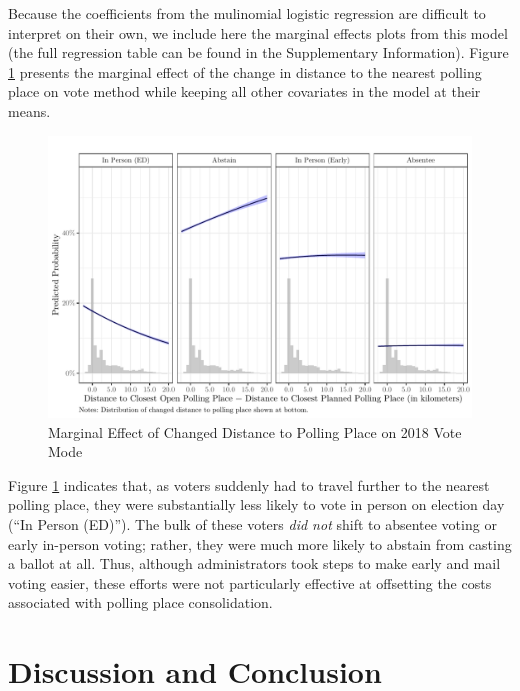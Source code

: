 \documentclass[
  12pt,
]{article}
\begin{document}
Because the coefficients from the mulinomial logistic regression are difficult to interpret on their own, we include here the marginal effects plots from this model (the full regression table can be found in the Supplementary Information). Figure \ref{fig:marg-multi} presents the marginal effect of the change in distance to the nearest polling place on vote method while keeping all other covariates in the model at their means.

\begin{figure}[h]

{\centering \includegraphics{hurricane_michael_files/figure-latex/marg-multi-1} 

}

\caption{\label{fig:marg-multi}Marginal Effect of Changed Distance to Polling Place on 2018 Vote Mode}\label{fig:marg-multi}
\end{figure}

Figure \ref{fig:marg-multi} indicates that, as voters suddenly had to travel further to the nearest polling place, they were substantially less likely to vote in person on election day (``In Person (ED)''). The bulk of these voters \emph{did not} shift to absentee voting or early in-person voting; rather, they were much more likely to abstain from casting a ballot at all. Thus, although administrators took steps to make early and mail voting easier, these efforts were not particularly effective at offsetting the costs associated with polling place consolidation.

\hypertarget{discussion-and-conclusion}{%
\section*{Discussion and Conclusion}\label{discussion-and-conclusion}}
\end{document}

